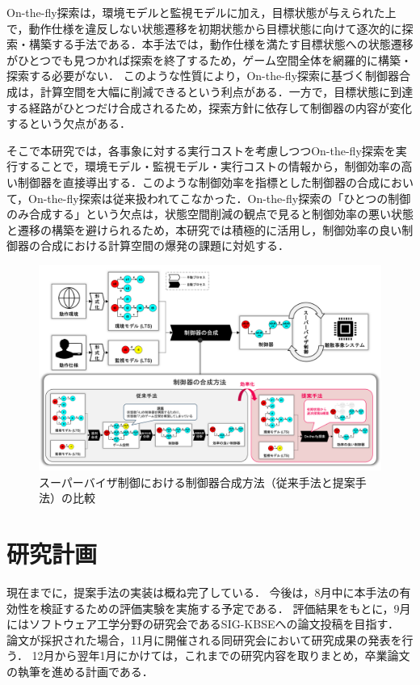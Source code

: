\documentclass[11pt]{jarticle}
\begin{document}
On-the-fly探索\cite{ddcs}は，環境モデルと監視モデルに加え，目標状態が与えられた上で，動作仕様を違反しない状態遷移を初期状態から目標状態に向けて逐次的に探索・構築する手法である．本手法では，動作仕様を満たす目標状態への状態遷移がひとつでも見つかれば探索を終了するため，ゲーム空間全体を網羅的に構築・探索する必要がない．
このような性質により，On-the-fly探索に基づく制御器合成は，計算空間を大幅に削減できるという利点がある．一方で，目標状態に到達する経路がひとつだけ合成されるため，探索方針に依存して制御器の内容が変化するという欠点がある．

そこで本研究では，各事象に対する実行コストを考慮しつつOn-the-fly探索を実行することで，環境モデル・監視モデル・実行コストの情報から，制御効率の高い制御器を直接導出する．このような制御効率を指標とした制御器の合成において，On-the-fly探索は従来扱われてこなかった．On-the-fly探索の「ひとつの制御のみ合成する」という欠点は，状態空間削減の観点で見ると制御効率の悪い状態と遷移の構築を避けられるため，本研究では積極的に活用し，制御効率の良い制御器の合成における計算空間の爆発の課題に対処する．

\begin{figure}[h]
  \centering
  \includegraphics[width=16cm]{./figures/proposal.png}
  \caption{スーパーバイザ制御における制御器合成方法（従来手法と提案手法）の比較}
  \label{fig:3}
\end{figure}


\section{研究計画}
現在までに，提案手法の実装は概ね完了している．
今後は，8月中に本手法の有効性を検証するための評価実験を実施する予定である．
評価結果をもとに，9月にはソフトウェア工学分野の研究会であるSIG-KBSEへの論文投稿を目指す．
論文が採択された場合，11月に開催される同研究会において研究成果の発表を行う．
12月から翌年1月にかけては，これまでの研究内容を取りまとめ，卒業論文の執筆を進める計画である．
\end{document}
